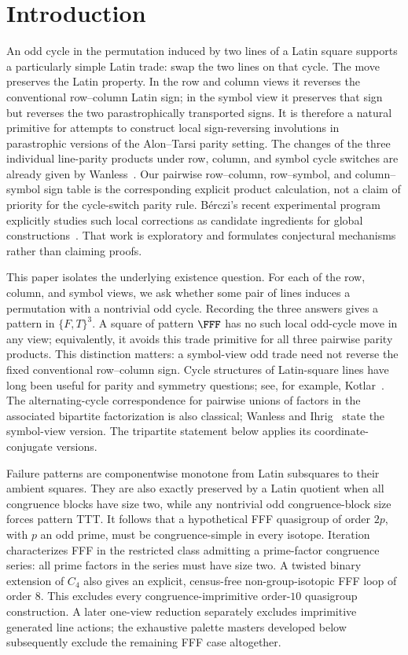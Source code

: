 \section{Introduction}

An odd cycle in the permutation induced by two lines of a Latin square
supports a particularly simple Latin trade: swap the two lines on that cycle.
The move preserves the Latin property.  In the row and column views it
reverses the conventional row--column Latin sign; in the symbol view it
preserves that sign but reverses the two parastrophically transported signs.
It is therefore a natural primitive for attempts to construct local
sign-reversing involutions in parastrophic versions of the Alon--Tarsi parity
setting. The changes of the three individual line-parity products under row,
column, and symbol cycle switches are already given by
Wanless~\cite[Proposition~1]{Wanless2004CycleSwitches}. Our pairwise
row--column, row--symbol, and column--symbol sign table is the corresponding
explicit product calculation, not a claim of priority for the cycle-switch
parity rule. B\'erczi's
recent experimental program explicitly studies such local corrections as
candidate ingredients for global constructions~\cite{Berczi2026}.  That work
is exploratory and formulates conjectural mechanisms rather than claiming
proofs.

This paper isolates the underlying existence question.  For each of the row,
column, and symbol views, we ask whether some pair of lines induces a
permutation with a nontrivial odd cycle.  Recording the three answers gives a
pattern in $\{F,T\}^3$.  A square of pattern $\FFF$ has no such local
odd-cycle move in any view; equivalently, it avoids this trade primitive for
all three pairwise parity products.  This distinction matters: a symbol-view
odd trade need not reverse the fixed conventional row--column sign.  Cycle
structures of Latin-square lines have long been useful for parity and
symmetry questions; see, for example, Kotlar~\cite{Kotlar2012}. The
alternating-cycle correspondence for pairwise unions of factors in the
associated bipartite factorization is also classical; Wanless and
Ihrig~\cite[Section~3]{WanlessIhrig2005Factorizations} state the
symbol-view version. The tripartite statement below applies its
coordinate-conjugate versions.

Failure patterns are componentwise monotone from Latin subsquares to their
ambient squares.  They are also
exactly preserved by a Latin quotient when all congruence blocks have size
two, while any nontrivial odd congruence-block size forces pattern TTT.  It
follows that a hypothetical FFF quasigroup of order $2p$, with $p$ an odd
prime, must be congruence-simple in every isotope.  Iteration characterizes
FFF in the restricted class admitting a prime-factor congruence series:
all prime factors in the series must have size two.  A twisted binary
extension of $C_4$ also gives an explicit,
census-free non-group-isotopic FFF loop of order $8$.  This excludes every
congruence-imprimitive order-$10$ quasigroup construction.  A later
one-view reduction separately excludes imprimitive generated line actions;
the exhaustive palette masters developed below subsequently exclude the
remaining FFF case altogether.

